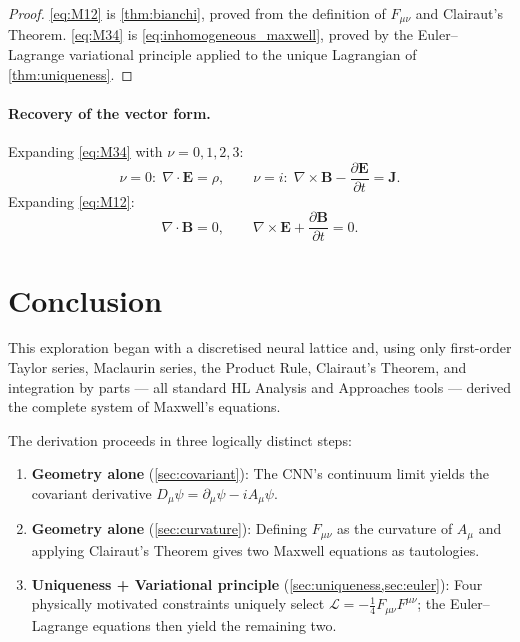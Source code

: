 \documentclass[12pt, a4paper]{article}
\theoremstyle{plain}
\theoremstyle{definition}
\theoremstyle{remark}
\newcommand{\Lag}{\mathcal{L}}
\begin{document}
\begin{proof}
\eqref{eq:M12} is \cref{thm:bianchi}, proved from the definition of $F_{\mu\nu}$ and Clairaut's Theorem.
\eqref{eq:M34} is \eqref{eq:inhomogeneous_maxwell}, proved by the Euler--Lagrange variational principle applied to the unique Lagrangian of \cref{thm:uniqueness}.
\end{proof}

\paragraph{Recovery of the vector form.}  Expanding \eqref{eq:M34} with $\nu = 0,1,2,3$:
\[
  \nu = 0:\;\nabla\cdot\mathbf{E} = \rho, \qquad
  \nu = i:\;\nabla\times\mathbf{B} - \frac{\partial\mathbf{E}}{\partial t} = \mathbf{J}.
\]
Expanding \eqref{eq:M12}:
\[
  \nabla\cdot\mathbf{B} = 0, \qquad
  \nabla\times\mathbf{E} + \frac{\partial\mathbf{B}}{\partial t} = 0.
\]

\section{Conclusion}

This exploration began with a discretised neural lattice and, using only first-order Taylor series, Maclaurin series, the Product Rule, Clairaut's Theorem, and integration by parts — all standard HL Analysis and Approaches tools — derived the complete system of Maxwell's equations.

The derivation proceeds in three logically distinct steps:

\begin{enumerate}
  \item \textbf{Geometry alone} (\cref{sec:covariant}): The CNN's continuum limit yields the covariant derivative $D_\mu\psi = \partial_\mu\psi - iA_\mu\psi$.
  \item \textbf{Geometry alone} (\cref{sec:curvature}): Defining $F_{\mu\nu}$ as the curvature of $A_\mu$ and applying Clairaut's Theorem gives two Maxwell equations as tautologies.
  \item \textbf{Uniqueness + Variational principle} (\cref{sec:uniqueness,sec:euler}): Four physically motivated constraints uniquely select $\Lag = -\tfrac{1}{4}F_{\mu\nu}F^{\mu\nu}$; the Euler--Lagrange equations then yield the remaining two.
\end{enumerate}
\end{document}
